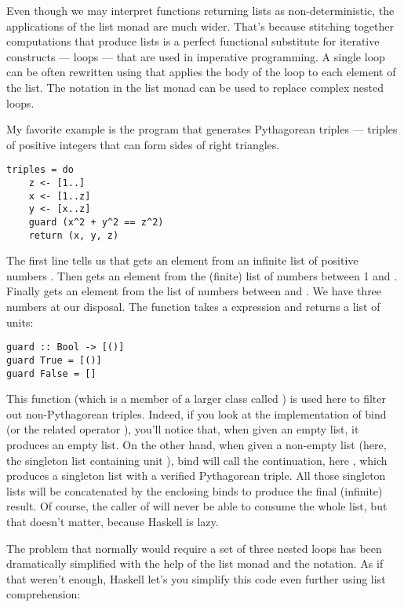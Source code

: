 Even though we may interpret functions returning lists as
non-deterministic, the applications of the list monad are much wider.
That's because stitching together computations that produce lists is a
perfect functional substitute for iterative constructs --- loops ---
that are used in imperative programming. A single loop can be often
rewritten using  that applies the body of the loop to each
element of the list. The  notation in the list monad can be
used to replace complex nested loops.

My favorite example is the program that generates Pythagorean triples
--- triples of positive integers that can form sides of right triangles.

\begin{verbatim}
triples = do
    z <- [1..]
    x <- [1..z]
    y <- [x..z]
    guard (x^2 + y^2 == z^2)
    return (x, y, z)
\end{verbatim}
The first line tells us that  gets an element from an infinite
list of positive numbers \code{{[}1..{]}}. Then  gets an
element from the (finite) list \code{{[}1..z{]}} of numbers between 1
and . Finally  gets an element from the list of
numbers between  and . We have three numbers
 at our
disposal. The function  takes a  expression
and returns a list of units:

\begin{verbatim}
guard :: Bool -> [()]
guard True = [()]
guard False = []
\end{verbatim}
This function (which is a member of a larger class called
) is used here to filter out non-Pythagorean triples.
Indeed, if you look at the implementation of bind (or the related
operator \code{>>}), you'll notice that,
when given an empty list, it produces an empty list. On the other hand,
when given a non-empty list (here, the singleton list containing unit
\code{{[}(){]}}), bind will call the continuation, here
, which produces a singleton list with a
verified Pythagorean triple. All those singleton lists will be
concatenated by the enclosing binds to produce the final (infinite)
result. Of course, the caller of  will never be able to
consume the whole list, but that doesn't matter, because Haskell is
lazy.

The problem that normally would require a set of three nested loops has
been dramatically simplified with the help of the list monad and the
 notation. As if that weren't enough, Haskell let's you
simplify this code even further using list comprehension:


